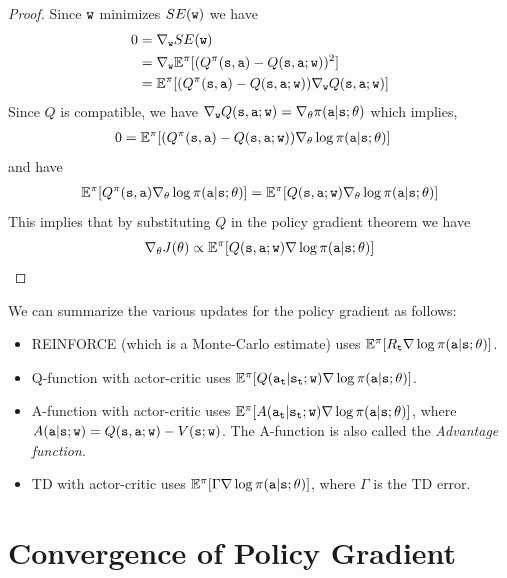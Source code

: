 \begin{proof}
Since ${\tt w}$ minimizes $SE({\tt w})$ we have
\begin{align*}
0 & = \nabla_{\tt w} SE({\tt w})\\
&= \nabla_{\tt w} \mathbb{E}^\pi[(Q^\pi({\tt s},{\tt a})-Q({\tt s},{\tt a};{\tt w}))^2]\\
&=
\mathbb{E}^\pi[(Q^\pi({\tt s},{\tt a})-Q({\tt s},{\tt a};{\tt w}))\nabla_{\tt w}
Q({\tt s},{\tt a};{\tt w})]
\end{align*}
Since $Q$ is compatible, we have $\nabla_{\tt w}
Q({\tt s},{\tt a};{\tt w})= \nabla_\theta
\pi({\tt a}|{\tt s};\theta)$ which implies,
\begin{align*}
0&=
\mathbb{E}^\pi[(Q^\pi({\tt s},{\tt a})-Q({\tt s},{\tt a};{\tt w}))\nabla_\theta
\log \pi({\tt a}|{\tt s};\theta)]
\end{align*}
and have
\begin{align*}
 \mathbb{E}^\pi[Q^\pi({\tt s},{\tt a})\nabla_\theta \log \pi({\tt a}|{\tt s};\theta)] = \mathbb{E}^\pi[Q({\tt s},{\tt a};{\tt w})\nabla_\theta \log \pi({\tt a}|{\tt s};\theta)]
\end{align*}
This implies that by substituting $Q$ in the policy gradient theorem
we have
\[
\nabla_\theta J(\theta) \propto \mathbb{E}^\pi[Q({\tt s},{\tt a};{\tt w})
\nabla \log \pi({\tt a}|{\tt s};\theta)]
\]
\end{proof}

We can summarize the various updates for the policy gradient as
follows:
\begin{itemize}
\item REINFORCE (which is a Monte-Carlo estimate) uses
$\mathbb{E}^\pi[R_{\tt t} \nabla\log\pi({\tt a}|{\tt s};\theta) ]$.
\item Q-function with actor-critic uses
$\mathbb{E}^\pi[Q({\tt a}_{\tt t}|{\tt s}_{\tt t};{\tt w})
\nabla\log\pi({\tt a}|{\tt s};\theta) ]$.
\item A-function with actor-critic uses
$\mathbb{E}^\pi[A({\tt a}_{\tt t}|{\tt s}_{\tt t};{\tt w})
\nabla\log\pi({\tt a}|{\tt s};\theta) ]$, where
$A({\tt a}|{\tt s};{\tt w})=Q({\tt s},{\tt a};{\tt w})-V({\tt s};{\tt w})$. The A-function is also called the \emph{Advantage function}.
\item TD with actor-critic uses
$\mathbb{E}^\pi[\Gamma\nabla\log\pi({\tt a}|{\tt s};\theta) ]$, where
$\Gamma$ is the TD error.
\end{itemize}

\section{Convergence of Policy Gradient}

